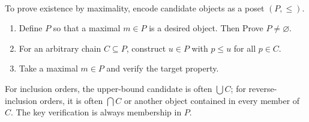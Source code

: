 \begin{method} \label{meth:zorn-maximality-template} \\
To prove existence by maximality, encode candidate objects as a poset $(P,\leq)$.
\begin{enumerate}[label=(\roman*)]
\setlength{\itemsep}{0pt}
\item Define $P$ so that a maximal $m\in P$ is a desired object. Then Prove $P\neq\varnothing$.
\item For an arbitrary chain $C\subseteq P$, construct $u\in P$ with $p\leq u$ for all $p\in C$.
\item Take a maximal $m\in P$ and verify the target property.
\end{enumerate}
For inclusion orders, the upper-bound candidate is often $\bigcup C$; for reverse-inclusion orders, it is often $\bigcap C$ or another object contained in every member of $C$. The key verification is always membership in $P$.
\end{method}
